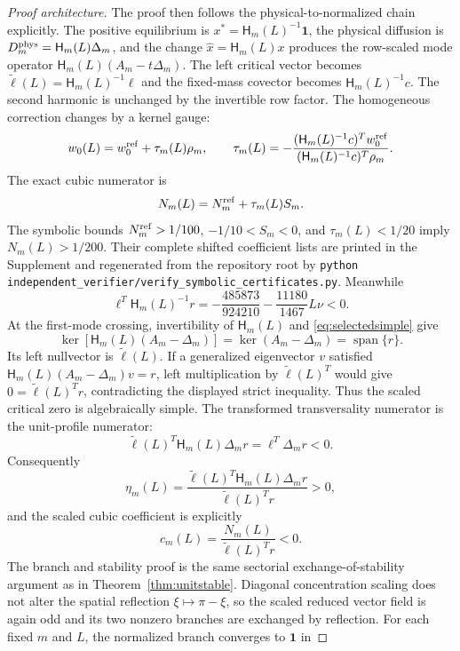 \documentclass[11pt]{article}
\theoremstyle{definition}
\newcommand{\1}{\mathbf 1}
\begin{document}
\begin{proof}[Proof architecture]
The proof then follows the physical-to-normalized chain explicitly.  The
positive equilibrium is $x^*=\mathsf H_m(L)^{-1}\1$, the physical diffusion is
$D_m^{\rm phys}=\mathsf H_m(L)\Delta_m$, and the change
$\widehat x=\mathsf H_m(L)x$
produces the row-scaled mode operator $\mathsf H_m(L)(A_m-t\Delta_m)$.
The left critical vector becomes
$\widetilde\ell(L)=\mathsf H_m(L)^{-1}\ell$ and the fixed-mass covector
becomes $\mathsf H_m(L)^{-1}c$.  The second harmonic is
unchanged by the invertible row factor.  The homogeneous correction changes
by a kernel gauge:
\begin{equation}\label{eq:gauge}
 w_0(L)=w_0^{\rm ref}+\tau_m(L)\rho_m,
 \qquad
 \tau_m(L)=-\frac{(\mathsf H_m(L)^{-1}c)^Tw_0^{\rm ref}}
 {(\mathsf H_m(L)^{-1}c)^T\rho_m}.
\end{equation}
The exact cubic numerator is
\begin{equation}\label{eq:NL}
 N_m(L)=N_m^{\rm ref}+\tau_m(L)S_m.
\end{equation}
The symbolic bounds
$N_m^{\rm ref}>1/100$, $-1/10<S_m<0$, and $\tau_m(L)<1/20$ imply
$N_m(L)>1/200$.  Their complete shifted coefficient lists are printed in the
Supplement and regenerated from the repository root by
\texttt{python independent\_verifier/verify\_symbolic\_certificates.py}.
Meanwhile
\[
 \ell^T\mathsf H_m(L)^{-1}r
 =-\frac{485873}{924210}-\frac{11180}{1467}L\nu<0.
\]
At the first-mode crossing, invertibility of $\mathsf H_m(L)$ and
\eqref{eq:selectedsimple} give
\[
 \ker\!\left[\mathsf H_m(L)(A_m-\Delta_m)\right]
 =\ker(A_m-\Delta_m)=\operatorname{span}\{r\}.
\]
Its left nullvector is $\widetilde\ell(L)$.  If a generalized eigenvector
$v$ satisfied
$\mathsf H_m(L)(A_m-\Delta_m)v=r$, left multiplication by
$\widetilde\ell(L)^T$ would give
$0=\widetilde\ell(L)^Tr$, contradicting the displayed strict inequality.
Thus the scaled critical zero is algebraically simple.
The transformed transversality numerator is the unit-profile numerator:
\[
 \widetilde\ell(L)^T\mathsf H_m(L)\Delta_m r
 =\ell^T\Delta_m r<0.
\]
Consequently
\[
 \eta_m(L)=
 \frac{\widetilde\ell(L)^T\mathsf H_m(L)\Delta_m r}
 {\widetilde\ell(L)^Tr}>0,
\]
and the scaled cubic coefficient is explicitly
\[
 c_m(L)=\frac{N_m(L)}{\widetilde\ell(L)^Tr}<0.
\]
The branch and stability proof is the
same sectorial exchange-of-stability argument as in
Theorem~\ref{thm:unitstable}.  Diagonal concentration scaling does not alter
the spatial reflection $\xi\mapsto\pi-\xi$, so the scaled reduced vector
field is again odd and its two nonzero branches are exchanged by reflection.
For each fixed $m$ and $L$, the normalized branch converges to $\1$ in

\end{proof}
\end{document}
